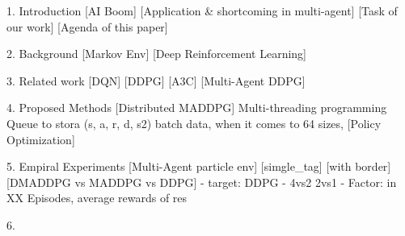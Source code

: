 1. Introduction
[AI Boom]
[Application & shortcoming in multi-agent]
[Task of our work]
[Agenda of this paper]

2. Background
[Markov Env]
[Deep Reinforcement Learning]

3. Related work
[DQN]
[DDPG]
[A3C]
[Multi-Agent DDPG]

4. Proposed Methods
[Distributed MADDPG]
Multi-threading programming
Queue to stora (s, a, r, d, s2) batch data, when it comes to 64 sizes,
[Policy Optimization]

5. Empiral Experiments
[Multi-Agent particle env] [simgle_tag] [with border]
[DMADDPG vs MADDPG vs DDPG] 
- target: DDPG
- 4vs2 2vs1
- Factor: in XX Episodes, average rewards of res

6. 